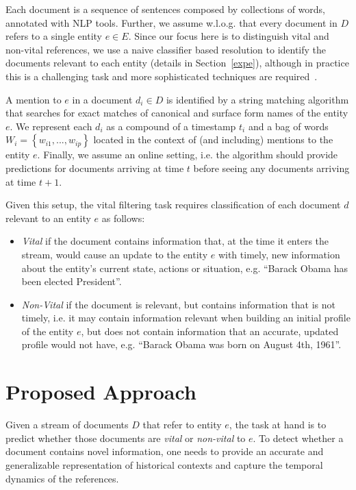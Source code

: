 \documentclass{article}
\begin{document}
Each document is a sequence of sentences composed by collections of words, annotated with NLP tools.
Further, we assume w.l.o.g. that every document in $D$ refers to a single entity $e \in E$. %
Since our focus here is to distinguish vital and non-vital references, we use a naive classifier based resolution to identify the documents relevant to each entity (details in Section~\ref{expe}), although in practice this is a challenging task and more sophisticated techniques are required~\citep{RaoMD10,singh11:acl}.

A mention to $e$ in a document $d_i \in D$ is identified by a string matching algorithm that searches for exact matches of canonical and surface form names of the entity $e$.
We represent each $d_i$ as a compound of a timestamp $t_i$ and a bag of words $W_i = \left\{ {w_{i1}, ..., w_{ip}}\right\}$ located in the context of (and including) mentions to the entity $e$. 
Finally, we assume an online setting, i.e. the algorithm should provide predictions for documents arriving at time $t$ before seeing any documents arriving at time $t+1$.

Given this setup, the vital filtering task requires classification of each document $d$ relevant to an entity $e$ as follows:
\begin{itemize}
    \item \emph{Vital} if the document contains information that, at the time it enters the stream, would cause an update to the entity $e$ with timely, new information about the entity's current state, actions or situation, e.g. ``Barack Obama has been elected President''.
    \item \emph{Non-Vital} if the document is relevant, but contains information that is not timely, i.e. it may contain information relevant when building an initial profile of the entity $e$, but does not contain information that an accurate, updated profile would not have, e.g. ``Barack Obama was born on August 4th, 1961''.
\end{itemize}

\section{Proposed Approach}
\label{approach}

Given a stream of documents $D$ that refer to entity $e$, the task at hand is to predict whether those documents are \emph{vital} or \emph{non-vital} to $e$. 
To detect whether a document contains novel information, one needs to provide an accurate and generalizable representation of historical contexts and capture the temporal dynamics of the references.
\end{document}
